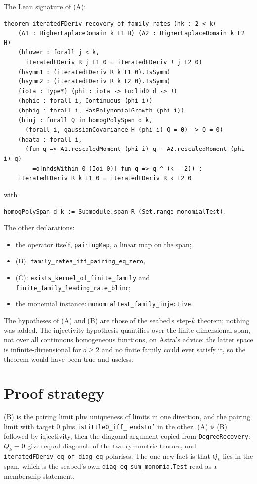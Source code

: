 \documentclass[11pt]{article}
\newcommand{\code}[1]{\texttt{#1}}
\begin{document}
\noindent The Lean signature of (A):
\begin{verbatim}
theorem iteratedFDeriv_recovery_of_family_rates (hk : 2 < k)
    (A1 : HigherLaplaceDomain k L1 H) (A2 : HigherLaplaceDomain k L2 H)
    (hlower : forall j < k,
      iteratedFDeriv R j L1 0 = iteratedFDeriv R j L2 0)
    (hsymm1 : (iteratedFDeriv R k L1 0).IsSymm)
    (hsymm2 : (iteratedFDeriv R k L2 0).IsSymm)
    {iota : Type*} (phi : iota -> EuclidD d -> R)
    (hphic : forall i, Continuous (phi i))
    (hphig : forall i, HasPolynomialGrowth (phi i))
    (hinj : forall Q in homogPolySpan d k,
      (forall i, gaussianCovariance H (phi i) Q = 0) -> Q = 0)
    (hdata : forall i,
      (fun q => A1.rescaledMoment (phi i) q - A2.rescaledMoment (phi i) q)
        =o[nhdsWithin 0 (Ioi 0)] fun q => q ^ (k - 2)) :
    iteratedFDeriv R k L1 0 = iteratedFDeriv R k L2 0
\end{verbatim}
with
\begin{center}\code{homogPolySpan d k := Submodule.span R (Set.range monomialTest)}.\end{center}
The other declarations:
\begin{itemize}
\item the operator itself, \code{pairingMap}, a linear map on the span;
\item (B): \code{family\_rates\_iff\_pairing\_eq\_zero};
\item (C): \code{exists\_kernel\_of\_finite\_family} and
\code{finite\_family\_leading\_rate\_blind};
\item the monomial instance: \code{monomialTest\_family\_injective}.
\end{itemize}

The hypotheses of (A) and (B) are those of the seabed's step-$k$
theorem; nothing was added. The injectivity hypothesis quantifies over
the finite-dimensional span, not over all continuous homogeneous
functions, on Astra's advice: the latter space is infinite-dimensional
for $d \ge 2$ and no finite family could ever satisfy it, so the theorem
would have been true and useless.

\section{Proof strategy}

(B) is the pairing limit plus uniqueness of limits in one direction, and
the pairing limit with target $0$ plus \code{isLittleO\_iff\_tendsto'} in
the other. (A) is (B) followed by injectivity, then the diagonal
argument copied from \code{DegreeRecovery}: $Q_k = 0$ gives equal
diagonals of the two symmetric tensors, and
\code{iteratedFDeriv\_eq\_of\_diag\_eq} polarises. The one new fact is
that $Q_k$ lies in the span, which is the seabed's own
\code{diag\_eq\_sum\_monomialTest} read as a membership statement.
\end{document}
